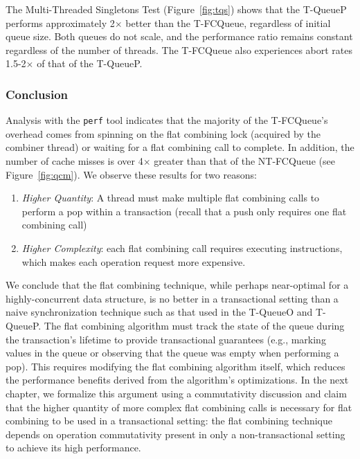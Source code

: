 The Multi-Threaded Singletons Test (Figure~\ref{fig:tqs}) shows that the T-QueueP performs approximately 2$\times$ better than the T-FCQueue, regardless of initial queue size. Both queues do not scale, and the performance ratio remains constant regardless of the number of threads. The T-FCQueue also experiences abort rates 1.5-2$\times$ of that of the T-QueueP.

\vspace{12pt}
\noindent{}

\subsubsection{Conclusion}
Analysis with the \texttt{perf} tool indicates that the majority of the T-FCQueue's overhead comes from spinning on the flat combining lock (acquired by the combiner thread) or waiting for a flat combining call to complete. In addition, the number of cache misses is over 4$\times$ greater than that of the NT-FCQueue (see Figure~\ref{fig:qcm}). We observe these results for two reasons:
\begin{enumerate}
\item \emph{Higher Quantity}: A thread must make multiple flat combining calls to perform a pop within a transaction (recall that a push only requires one flat combining call) 
\item \emph{Higher Complexity}: each flat combining call requires executing instructions, which makes each operation request more expensive.
\end{enumerate}

We conclude that the flat combining technique, while perhaps near-optimal for a highly-concurrent data structure, is no better in a transactional setting than a naive synchronization technique such as that used in the T-QueueO and T-QueueP. The flat combining algorithm must track the state of the queue during the transaction's lifetime to provide transactional guarantees (e.g., marking values in the queue or observing that the queue was empty when performing a pop). This requires modifying the flat combining algorithm itself, which reduces the performance benefits derived from the algorithm's optimizations. In the next chapter, we formalize this argument using a commutativity discussion and claim that the higher quantity of more complex flat combining calls is necessary for flat combining to be used in a transactional setting: the flat combining technique depends on operation commutativity present in only a non-transactional setting to achieve its high performance. 

